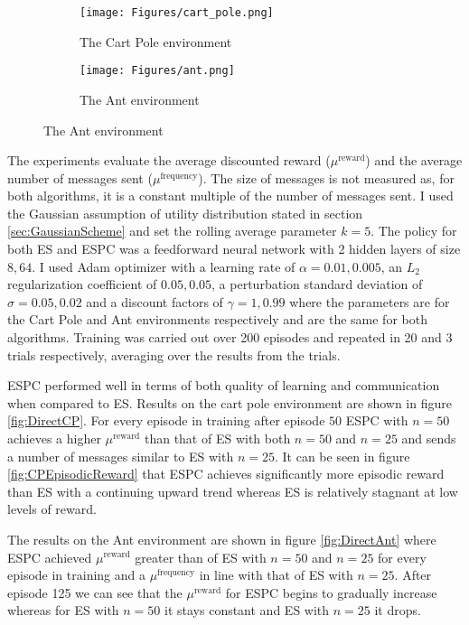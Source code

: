 \begin{figure}
    \centering
    \begin{subfigure}{0.4\textwidth}
        \centering
        \texttt{[image: Figures/cart\_pole.png]}
        \caption{The Cart Pole environment}
        \label{fig:CartPole}
    \end{subfigure}
    \begin{subfigure}{0.4\textwidth}
        \centering
        \texttt{[image: Figures/ant.png]}
        \caption{The Ant environment}
        \label{fig:Ant}
    \end{subfigure}
\end{figure}

The experiments evaluate the average discounted reward ($\mu^{\text{reward}}$) and the average number of messages sent ($\mu^{\text{frequency}}$). The size of messages is not measured as, for both algorithms, it is a constant multiple of the number of messages sent.
I used the Gaussian assumption of utility distribution stated in section \ref{sec:GaussianScheme} and set the rolling average parameter $k=5$. The policy for both ES and ESPC was a feedforward neural network with 2 hidden layers of size $8,64$. I used Adam optimizer \cite{Adam} with a learning rate of $\alpha=0.01,0.005$, an $L_2$ regularization coefficient of $0.05,0.05$, a perturbation standard deviation of $\sigma=0.05,0.02$ and a discount factors of $\gamma=1,0.99$ where the parameters are for the Cart Pole and Ant environments respectively and are the same for both algorithms. Training was carried out over 200 episodes and repeated in 20 and 3 trials respectively, averaging over the results from the trials.
\label{sec:ESPCEval}

ESPC performed well in terms of both quality of learning and communication when compared to ES. 
Results on the cart pole environment are shown in figure \ref{fig:DirectCP}. For every episode in training after episode $50$ ESPC with $n=50$ achieves a higher $\mu^\text{reward}$ than that of ES with both $n=50$ and $n=25$ and sends a number of messages similar to ES with $n=25$. It can be seen in figure \ref{fig:CPEpisodicReward} that ESPC achieves significantly more episodic reward than ES with a continuing upward trend whereas ES is relatively stagnant at low levels of reward.

The results on the Ant environment are shown in figure \ref{fig:DirectAnt} where ESPC achieved $\mu^\text{reward}$ greater than of ES with $n=50$ and $n=25$ for every episode in training and a $\mu^\text{frequency}$ in line with that of ES with $n=25$. After episode 125 we can see that the $\mu^\text{reward}$ for ESPC begins to gradually increase whereas for ES with $n=50$ it stays constant and ES with $n=25$ it drops.

